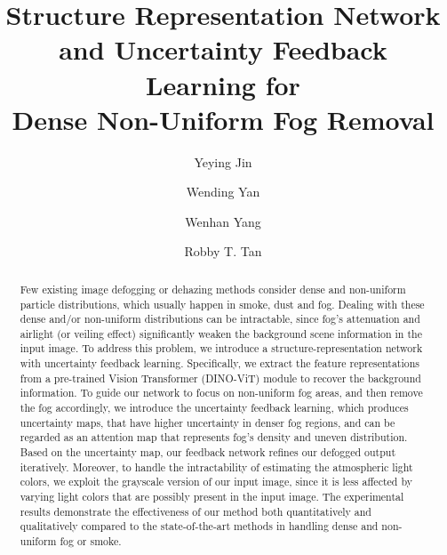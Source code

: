 \documentclass[runningheads]{llncs}
\begin{document}
\pagestyle{headings}
\mainmatter

\def\ACCV22SubNumber{393}  

\title{Structure Representation Network and Uncertainty Feedback Learning for \\Dense Non-Uniform Fog Removal} 

\author{Yeying Jin \and
	Wending Yan \and
	Wenhan Yang \and
	Robby T. Tan}

\def\thefootnote{}\def\thefootnote{\arabic{footnote}}

\maketitle

\begin{abstract}
Few existing image defogging or dehazing methods consider dense and non-uniform particle distributions, which usually happen in smoke, dust and fog.
Dealing with these dense and/or non-uniform distributions can be intractable, since fog's attenuation and airlight (or veiling effect) significantly weaken the background scene information in the input image.
To address this problem, we introduce a structure-representation network with uncertainty feedback learning.
Specifically, we extract the feature representations from a  pre-trained Vision Transformer (DINO-ViT) module to recover the background information.
To guide our network to focus on non-uniform fog areas, and then remove the fog accordingly, we introduce the uncertainty feedback learning, which produces uncertainty maps, that have higher uncertainty in denser fog regions, and can be regarded as an attention map that represents fog's density and uneven distribution.
Based on the uncertainty map, our feedback network refines our defogged output iteratively.
Moreover, to handle the intractability of estimating the atmospheric light colors, we exploit the grayscale version of our input image, since it is less affected by varying light colors that are possibly present in the input image.
The experimental results demonstrate the effectiveness of our method both quantitatively and qualitatively compared to the state-of-the-art methods in handling dense and non-uniform fog or smoke.
\end{abstract}
\end{document}
